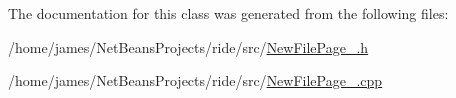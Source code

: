 The documentation for this class was generated from the following files\-:\begin{DoxyCompactItemize}
\item 
/home/james/\-Net\-Beans\-Projects/ride/src/\hyperlink{_new_file_page__3_8h}{New\-File\-Page\-\_.\-h}\item 
/home/james/\-Net\-Beans\-Projects/ride/src/\hyperlink{_new_file_page__3_8cpp}{New\-File\-Page\-\_.\-cpp}\end{DoxyCompactItemize}
